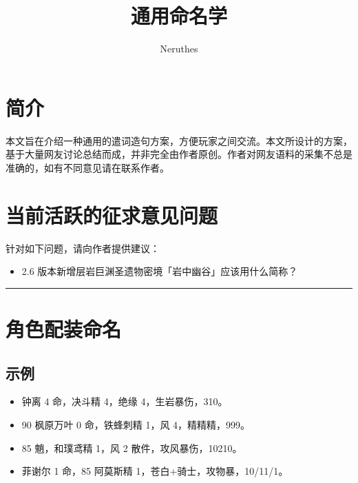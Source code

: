 
\uselangzh
\title{通用命名学}
\author{Neruthes}

\usepackage{datetime2}
\usepackage{longtable}
\usepackage{tabu}
\usepackage{tasks}

\setlength{\tabulinesep}{5pt}









\section*{简介}

本文旨在介绍一种通用的遣词造句方案，方便玩家之间交流。本文所设计的方案，基于大量网友讨论总结而成，并非完全由作者原创。作者对网友语料的采集不总是准确的，如有不同意见请在联系作者。

\section*{当前活跃的征求意见问题}

针对如下问题，请向作者提供建议：

\begin{itemize}
	\item 2.6 版本新增层岩巨渊圣遗物密境「岩中幽谷」应该用什么简称？
\end{itemize}

\maketoc{}{}

\vspace{2em}
\hrule

\section{角色配装命名}

\subsection{示例}


\begin{itemize}
	\item 钟离 4 命，决斗精 4，绝缘 4，生岩暴伤，310。
	\item 90 枫原万叶 0 命，铁蜂刺精 1，风 4，精精精，999。
	\item 85 魈，和璞鸢精 1，风 2 散件，攻风暴伤，10210。
	\item 菲谢尔 1 命，85 阿莫斯精 1，苍白+骑士，攻物暴，10/11/1。
\end{itemize}

